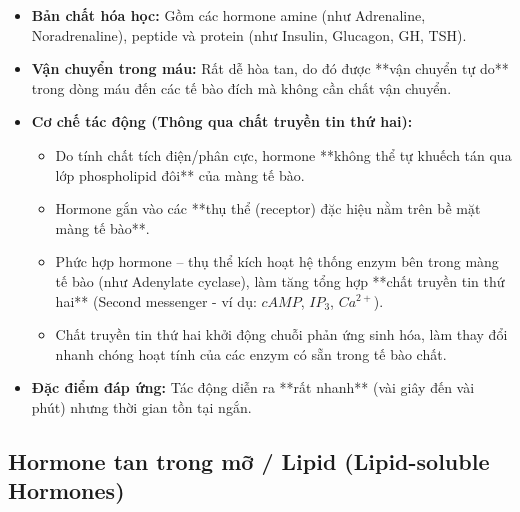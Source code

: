 \begin{itemize}
    \item \textbf{Bản chất hóa học:} Gồm các hormone amine (như Adrenaline, Noradrenaline), peptide và protein (như Insulin, Glucagon, GH, TSH).
    \item \textbf{Vận chuyển trong máu:} Rất dễ hòa tan, do đó được **vận chuyển tự do** trong dòng máu đến các tế bào đích mà không cần chất vận chuyển.
    \item \textbf{Cơ chế tác động (Thông qua chất truyền tin thứ hai):}
    \begin{itemize}
        \item Do tính chất tích điện/phân cực, hormone **không thể tự khuếch tán qua lớp phospholipid đôi** của màng tế bào.
        \item Hormone gắn vào các **thụ thể (receptor) đặc hiệu nằm trên bề mặt màng tế bào**.
        \item Phức hợp hormone -- thụ thể kích hoạt hệ thống enzym bên trong màng tế bào (như Adenylate cyclase), làm tăng tổng hợp **chất truyền tin thứ hai** (Second messenger - ví dụ: $cAMP$, $IP_3$, $Ca^{2+}$).
        \item Chất truyền tin thứ hai khởi động chuỗi phản ứng sinh hóa, làm thay đổi nhanh chóng hoạt tính của các enzym có sẵn trong tế bào chất.
    \end{itemize}
    \item \textbf{Đặc điểm đáp ứng:} Tác động diễn ra **rất nhanh** (vài giây đến vài phút) nhưng thời gian tồn tại ngắn.
\end{itemize}

\subsection{Hormone tan trong mỡ / Lipid (Lipid-soluble Hormones)}

